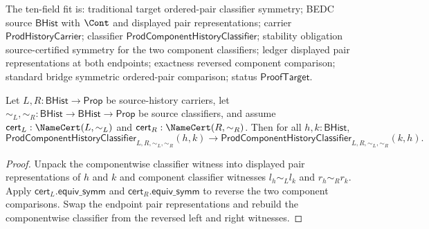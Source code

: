 \begin{theorem}
\label{thm:prod-component-history-classifier-symmetry-from-source-certificates}
The ten-field fit is: traditional target ordered-pair classifier symmetry;
BEDC source $\mathsf{BHist}$ with $\Cont$ and displayed pair representations;
carrier $\mathsf{ProdHistoryCarrier}$; classifier
$\mathsf{ProdComponentHistoryClassifier}$; stability obligation
source-certified symmetry for the two component classifiers; ledger displayed
pair representations at both endpoints; exactness reversed component
comparison; standard bridge symmetric ordered-pair comparison; status
$\mathsf{ProofTarget}$.

Let $L,R:\mathsf{BHist}\to\mathsf{Prop}$ be source-history carriers, let
$\sim_L,\sim_R:\mathsf{BHist}\to\mathsf{BHist}\to\mathsf{Prop}$ be source
classifiers, and assume $\mathsf{cert}_L:\NameCert(L,\sim_L)$ and
$\mathsf{cert}_R:\NameCert(R,\sim_R)$. Then for all $h,k:\mathsf{BHist}$,
$$
\mathsf{ProdComponentHistoryClassifier}_{L,R,\sim_L,\sim_R}(h,k)\to
\mathsf{ProdComponentHistoryClassifier}_{L,R,\sim_L,\sim_R}(k,h).
$$
\end{theorem}
\begin{proof}
Unpack the componentwise classifier witness into displayed pair
representations of $h$ and $k$ and component classifier witnesses
$l_h\sim_L l_k$ and $r_h\sim_R r_k$. Apply
$\mathsf{cert}_L.\mathsf{equiv\_symm}$ and
$\mathsf{cert}_R.\mathsf{equiv\_symm}$ to reverse the two component
comparisons. Swap the endpoint pair representations and rebuild the
componentwise classifier from the reversed left and right witnesses.
\end{proof}

